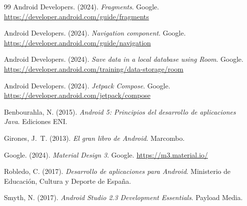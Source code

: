 \documentclass[stu, 12pt, letterpaper, donotrepeattitle, floatsintext, natbib]{apa7}
\begin{document}
\renewcommand{\refname}{\large\textbf{Referencias de la Entrega 2}}
\begin{thebibliography}{99}
Android Developers. (2024). \textit{Fragments}. Google.
\url{https://developer.android.com/guide/fragments}

Android Developers. (2024). \textit{Navigation component}. Google.
\url{https://developer.android.com/guide/navigation}

Android Developers. (2024). \textit{Save data in a local database using Room}. Google.
\url{https://developer.android.com/training/data-storage/room}

Android Developers. (2024). \textit{Jetpack Compose}. Google.
\url{https://developer.android.com/jetpack/compose}

Benbourahla, N. (2015). \textit{Android 5: Principios del desarrollo de aplicaciones Java}. Ediciones ENI.

Girones, J.~T. (2013). \textit{El gran libro de Android}. Marcombo.

Google. (2024). \textit{Material Design 3}. Google.
\url{https://m3.material.io/}

Robledo, C. (2017). \textit{Desarrollo de aplicaciones para Android}. Ministerio de
Educación, Cultura y Deporte de España.

Smyth, N. (2017). \textit{Android Studio 2.3 Development Essentials}. Payload Media.
\end{thebibliography}
\end{document}
